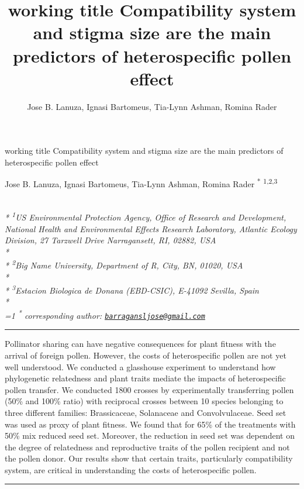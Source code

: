 \documentclass[11pt,a4paper]{article}
\title{working title Compatibility system and stigma size are the main
predictors of heterospecific pollen effect}
\author{
Jose B. Lanuza, Ignasi Bartomeus, Tia-Lynn Ashman, Romina Rader
}
\date{}
\begin{document}
\begin{singlespace}
\begin{center}
\huge working title Compatibility system and stigma size are the main
predictors of heterospecific pollen effect
\end{center}
\begin{center}
\large
Jose B. Lanuza, Ignasi Bartomeus, Tia-Lynn Ashman, Romina Rader \textsuperscript{*} \textsuperscript{1,2,3} 
\end{center}
\begin{justify}
\footnotesize \emph{ 
\\*
\textsuperscript{1}US Environmental Protection Agency, Office of Research and Development,
National Health and Environmental Effects Research Laboratory, Atlantic
Ecology Division, 27 Tarzwell Drive Narragansett, RI, 02882, USA\\*
\\*
\textsuperscript{2}Big Name University, Department of R, City, BN, 01020, USA\\*
\\*
\textsuperscript{3}Estacion Biologica de Donana (EBD-CSIC), E-41092 Sevilla, Spain\\*
}
\setcounter{num}{1}
\\[0.1cm]
\footnotesize \emph{ 
\ifnum\value{num}=1%
\textsuperscript{*} corresponding author:
\fi
\href{mailto:barragansljose@gmail.com}{\nolinkurl{barragansljose@gmail.com}}
}
\end{justify}
\normalsize

\end{singlespace}


\singlespace

\vspace{2mm}\hrule

Pollinator sharing can have negative consequences for plant fitness with
the arrival of foreign pollen. However, the costs of heterospecific
pollen are not yet well understood. We conducted a glasshouse experiment
to understand how phylogenetic relatedness and plant traits mediate the
impacts of heterospecific pollen transfer. We conducted 1800 crosses by
experimentally transferring pollen (50\% and 100\% ratio) with
reciprocal crosses between 10 species belonging to three different
families: Brassicaceae, Solanaceae and Convolvulaceae. Seed set was used
as proxy of plant fitness. We found that for 65\% of the treatments with
50\% mix reduced seed set. Moreover, the reduction in seed set was
dependent on the degree of relatedness and reproductive traits of the
pollen recipient and not the pollen donor. Our results show that certain
traits, particularly compatibility system, are critical in understanding
the costs of heterospecific pollen. \vspace{3mm}\hrule
\end{document}
